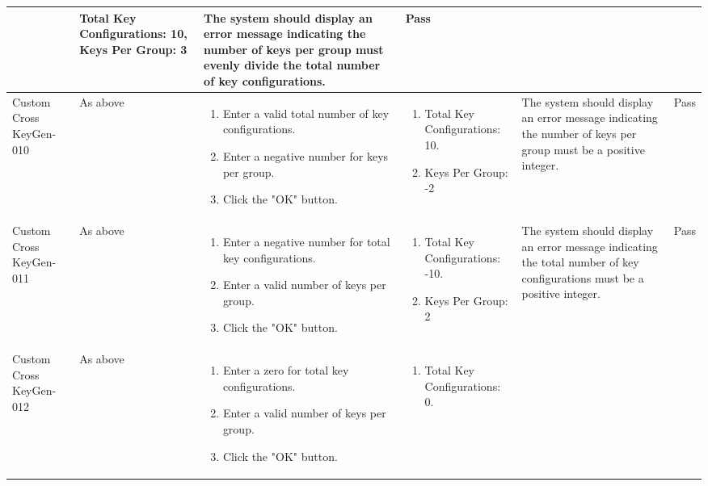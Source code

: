 \documentclass[]{final_report}
\theoremstyle{definition}
\begin{document}
\begin{longtable}{|p{1.5cm}|p{2.5cm}|p{3.5cm}|p{2.5cm}|p{3cm}|p{2cm}|}
\begin{enumerate}
  \end{enumerate} & Total Key Configurations: 10, Keys Per Group: 3 & The system should display an error message indicating the number of keys per group must evenly divide the total number of key configurations. & Pass \\
  \hline
  Custom
  Cross
  KeyGen-010 & As above & 
  \begin{enumerate}
    \item Enter a valid total number of key configurations.
    \item Enter a negative number for keys per group.
    \item Click the "OK" button.
  \end{enumerate} & 
     \begin{enumerate}
    \item Total Key Configurations: 10.
    \item Keys Per Group: -2
   \end{enumerate}  
  & The system should display an error message indicating the number of keys per group must be a positive integer. & Pass \\
  \hline
  Custom
  Cross
  KeyGen-011 & As above & 
  \begin{enumerate}
    \item Enter a negative number for total key configurations.
    \item Enter a valid number of keys per group.
    \item Click the "OK" button.
  \end{enumerate} &   \begin{enumerate}
    \item Total Key Configurations: -10.
    \item Keys Per Group: 2
   \end{enumerate}   & The system should display an error message indicating the total number of key configurations must be a positive integer. & Pass \\
  \hline
  Custom
  Cross
  KeyGen-012 & As above & 
  \begin{enumerate}
    \item Enter a zero for total key configurations.
    \item Enter a valid number of keys per group.
    \item Click the "OK" button.
  \end{enumerate} &   \begin{enumerate}
    \item Total Key Configurations: 0.

\end{enumerate}
\end{longtable}
\end{document}
